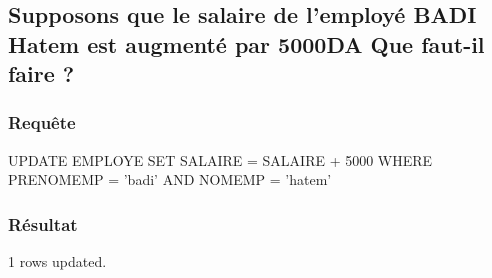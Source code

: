 \documentclass[•]{article}
\begin{document}
\subsection{Supposons que le salaire de l’employé BADI Hatem est augmenté par 5000DA Que faut-il faire ?}
\subsubsection{Requête}
\begin{sql}
UPDATE EMPLOYE SET SALAIRE = SALAIRE + 5000 WHERE PRENOMEMP = 'badi' AND NOMEMP = 'hatem'    
\end{sql}
\subsubsection{Résultat}
\begin{sql}
1 rows updated.
\end{sql}
\end{document}
